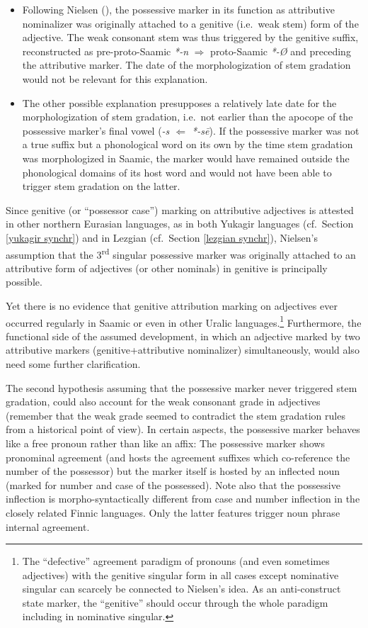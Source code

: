 {\begin{itemize}
\item Following Nielsen (\citeyear{nielsen1945b}), the possessive marker in its function as attributive nominalizer was originally attached to a genitive (i.e.~weak stem) form of the adjective. The weak consonant stem was thus triggered by the genitive suffix, reconstructed as pre-proto-Saamic \textit{*-n} $\Rightarrow$ proto-Saamic \mbox{\textit{*-Ø}} \cite[65]{sammallahti1998b} and preceding the attributive marker. The date of the morphologization of stem gradation would not be relevant for this explanation.
\item The other possible explanation presupposes a relatively late date for the morphologization of stem gradation, i.e.~not earlier than the apocope of the possessive marker's final vowel (\textit{-s $\Leftarrow$ *-sē}). If the possessive marker was not a true suffix but a phonological word on its own by the time stem gradation was morphologized in Saamic, the marker would have remained outside the phonological domains of its host word and would not have been able to trigger stem gradation on the latter. 
\end{itemize}

\noindent Since genitive (or “possessor case”) marking on attributive adjectives is attested in other northern Eurasian languages, as in both Yukagir languages (cf.~Section \ref{yukagir synchr}) and in Lezgian (cf.~Section \ref{lezgian synchr}), Nielsen's assumption that the 3\textsuperscript{rd} singular possessive marker was originally attached to an attributive form of adjectives (or other nominals) in genitive is principally possible. 

Yet there is no evidence that genitive attribution marking on adjectives ever occurred regularly in Saamic or even in other Uralic languages.\footnote{The “defective” agreement paradigm of pronouns (and even sometimes adjectives) with the genitive singular form in all cases except nominative singular can scarcely be connected to Nielsen's idea. As an anti-construct state marker, the “genitive” should occur through the whole paradigm including in nominative singular.} Furthermore, the functional side of the assumed development, in which an adjective marked by two attributive markers (genitive+attributive nominalizer) simultaneously, would also need some further clarification.

The second hypothesis assuming that the possessive marker never triggered stem gradation, could also account for the weak consonant grade in adjectives (remember that the weak grade seemed to contradict the stem gradation rules from a historical point of view). In certain aspects, the possessive marker behaves like a free pronoun rather than like an affix: The possessive marker shows pronominal agreement (and hosts the agreement suffixes which co-reference the number of the possessor) but the marker itself is hosted by an inflected noun (marked for number and case of the possessed). Note also that the possessive inflection is morpho-syntactically different from case and number inflection in the closely related Finnic languages. Only the latter features trigger noun phrase internal agreement.

}

